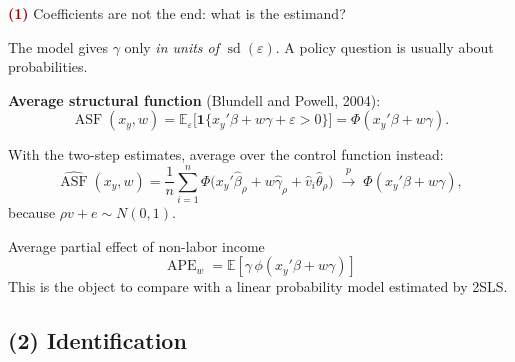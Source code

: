 \documentclass[aspectratio=169,11pt]{beamer}
\newcommand{\E}{\mathbb{E}}
\newcommand{\ind}{\mathbf{1}}
\newcommand{\Part}[1]{\textcolor{DarkRed}{\textbf{(#1)}}}
\begin{document}
\begin{frame}{\Part{1} Coefficients are not the end: what is the estimand?}

The model gives $\gamma$ only \emph{in units of} $\operatorname{sd}(\varepsilon)$.
A policy question is usually about probabilities.

\vspace{0.3em}

\textbf{Average structural function} (Blundell and Powell, 2004):
\[
\operatorname{ASF}(x_y,w)=\E_\varepsilon\big[\ind\{x_y'\beta+w\gamma+\varepsilon>0\}\big]
=\Phi(x_y'\beta+w\gamma).
\]

\pause

With the two-step estimates, average over the control function instead:
\[
\widehat{\operatorname{ASF}}(x_y,w)
=\frac1n\sum_{i=1}^n
\Phi\big(x_y'\hat\beta_\rho+w\hat\gamma_\rho+\hat v_i\hat\theta_\rho\big)
\;\xrightarrow{p}\;
\Phi(x_y'\beta+w\gamma),
\]
because $\rho v+e\sim N(0,1)$.

\pause

\begin{block}{Average partial effect of non-labor income}
\[
\operatorname{APE}_w=\E\!\left[\gamma\,\phi(x_y'\beta+w\gamma)\right]
\]
This is the object to compare with a linear probability model estimated by 2SLS.
\end{block}

\end{frame}

\subsection{(2) Identification}
\end{document}
